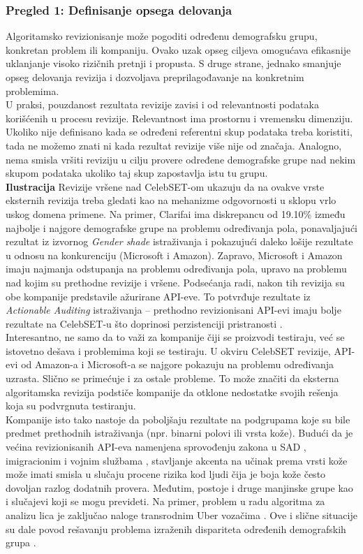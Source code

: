 \documentclass[11pt, a4paper]{article}
\begin{document}
\subsubsection{Pregled 1: Definisanje opsega delovanja}
Algoritamsko revizionisanje može pogoditi određenu demografsku grupu, konkretan problem ili kompaniju. Ovako uzak opseg ciljeva omogućava efikasnije uklanjanje visoko rizičnih pretnji i propusta. S druge strane, jednako smanjuje opseg delovanja revizija i dozvoljava preprilagođavanje na konkretnim problemima. \\
\indent U praksi, pouzdanost rezultata revizije zavisi i od relevantnosti podataka korišćenih u procesu revizije. Relevantnost ima prostornu i vremensku dimenziju. Ukoliko nije definisano kada se određeni referentni skup podataka treba koristiti, tada ne možemo znati ni kada rezultat revizije više nije od značaja. Analogno, nema smisla vršiti reviziju u cilju provere određene demografske grupe nad nekim skupom podataka ukoliko taj skup zapostavlja istu tu grupu. \\
\indent\textbf{Ilustracija} Revizije vršene nad CelebSET-om ukazuju da na ovakve vrste eksternih revizija treba gledati kao na mehanizme odgovornosti u sklopu vrlo uskog domena primene. Na primer, Clarifai ima diskrepancu od 19.10\% između najbolje i najgore demografske grupe na problemu određivanja pola, ponavaljajući rezultat iz izvornog \textit{Gender shade} istraživanja \cite{G6} i pokazujući daleko lošije rezultate u odnosu na konkurenciju (Microsoft i Amazon). Zapravo, Microsoft i Amazon imaju najmanja odstupanja na problemu određivanja pola, upravo na problemu nad kojim su prethodne revizije i vršene. Podsećanja radi, nakon tih revizija su obe kompanije predstavile ažurirane API-eve. To potvrđuje rezultate iz \textit{Actionable Auditing} istraživanja -- prethodno revizionisani API-evi imaju bolje rezultate na CelebSET-u što doprinosi perzistenciji pristranosti \cite{G39}.\\
\indent Interesantno, ne samo da to važi za kompanije čiji se proizvodi testiraju, već se istovetno dešava i problemima koji se testiraju. U okviru CelebSET revizije, API-evi od Amazon-a i Microsoft-a se najgore pokazuju na problemu određivanja uzrasta. Slično se primećuje i za ostale probleme. To može značiti da eksterna algoritamska revizija podstiče kompanije da otklone nedostatke svojih rešenja koja su podvrgnuta testiranju. \\
\indent Kompanije isto tako nastoje da poboljšaju rezultate na podgrupama koje su bile predmet prethodnih istraživanja (npr. binarni polovi ili vrsta kože). Budući da je većina revizionisanih API-eva namenjena sprovođenju zakona u SAD \cite{G7}, imigracionim i vojnim službama \cite{G18, G30}, stavljanje akcenta na učinak prema vrsti kože može imati smisla u slučaju procene rizika kod ljudi čija je boja kože često dovoljan razlog dodatnih provera. Međutim, postoje i druge manjinske grupe kao i slučajevi koji se mogu prevideti. Na primer, problem u radu algoritma za analizu lica je zaključao naloge transrodnim Uber vozačima \cite{G31}. Ove i slične situacije su dale povod rešavanju problema izraženih dispariteta određenih demografskih grupa \cite{G42}. \\
\end{document}
